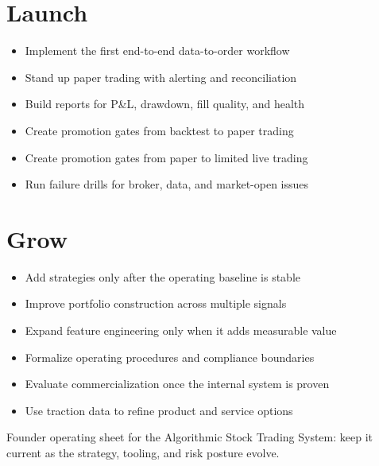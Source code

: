 \documentclass[10pt]{article}
\newcommand{\checkitem}[1]{\item[$\square$] #1}
\begin{document}
\begin{minipage}[t]{0.49\textwidth}
\section*{Launch}
\begin{itemize}
    \checkitem{Implement the first end-to-end data-to-order workflow}
    \checkitem{Stand up paper trading with alerting and reconciliation}
    \checkitem{Build reports for P\&L, drawdown, fill quality, and health}
    \checkitem{Create promotion gates from backtest to paper trading}
    \checkitem{Create promotion gates from paper to limited live trading}
    \checkitem{Run failure drills for broker, data, and market-open issues}
\end{itemize}

\section*{Grow}
\begin{itemize}
    \checkitem{Add strategies only after the operating baseline is stable}
    \checkitem{Improve portfolio construction across multiple signals}
    \checkitem{Expand feature engineering only when it adds measurable value}
    \checkitem{Formalize operating procedures and compliance boundaries}
    \checkitem{Evaluate commercialization once the internal system is proven}
    \checkitem{Use traction data to refine product and service options}
\end{itemize}
\end{minipage}

\vfill
{\footnotesize Founder operating sheet for the Algorithmic Stock Trading System: keep it current as the strategy, tooling, and risk posture evolve.}
\end{document}
